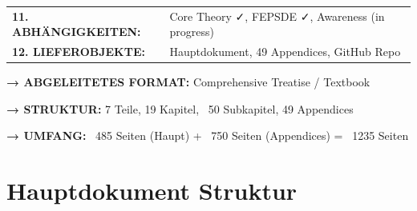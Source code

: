 \documentclass[12pt,a4paper]{article}
\begin{document}
\begin{tcolorbox}[colback=bcmblue!10!white, colframe=bcmblue,
    title=\textbf{EBF ``Complementarity and Context'': Die 12 Dimensionen}]
\begin{tabular}{@{}p{3.5cm}p{10cm}@{}}
\textbf{11. ABHÄNGIGKEITEN:} & Core Theory ✓, FEPSDE ✓, Awareness (in progress) \\[0.5em]

\textbf{12. LIEFEROBJEKTE:} & Hauptdokument, 49 Appendices, GitHub Repo \\
\end{tabular}

\tcblower

\textbf{→ ABGELEITETES FORMAT:} Comprehensive Treatise / Textbook

\textbf{→ STRUKTUR:} 7 Teile, 19 Kapitel, ~50 Subkapitel, 49 Appendices

\textbf{→ UMFANG:} ~485 Seiten (Haupt) + ~750 Seiten (Appendices) = ~1235 Seiten

\end{tcolorbox}


\section{Hauptdokument Struktur}
\end{document}
